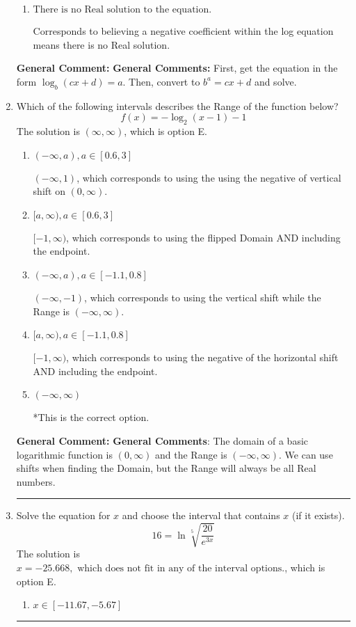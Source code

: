 \documentclass{extbook}[14pt]
\newcommand{\litem}[1]{\item #1

\rule{\textwidth}{0.4pt}}
\begin{document}
\begin{enumerate}
{\begin{enumerate}[label=\Alph*.]
$x = 4.250$, which corresponds to ignoring the vertical shift when converting to exponential form.
\item \( \text{There is no Real solution to the equation.} \)

Corresponds to believing a negative coefficient within the log equation means there is no Real solution.
\end{enumerate}

\textbf{General Comment:} \textbf{General Comments:} First, get the equation in the form $\log_b{(cx+d)} = a$. Then, convert to $b^a = cx+d$ and solve.
}
\litem{
Which of the following intervals describes the Range of the function below?
\[ f(x) = -\log_2{(x-1)}-1 \]The solution is \( (\infty, \infty) \), which is option E.\begin{enumerate}[label=\Alph*.]
\item \( (-\infty, a), a \in [0.6, 3] \)

$(-\infty, 1)$, which corresponds to using the using the negative of vertical shift on $(0, \infty)$.
\item \( [a, \infty), a \in [0.6, 3] \)

$[-1, \infty)$, which corresponds to using the flipped Domain AND including the endpoint.
\item \( (-\infty, a), a \in [-1.1, 0.8] \)

$(-\infty, -1)$, which corresponds to using the vertical shift while the Range is $(-\infty, \infty)$.
\item \( [a, \infty), a \in [-1.1, 0.8] \)

$[-1, \infty)$, which corresponds to using the negative of the horizontal shift AND including the endpoint.
\item \( (-\infty, \infty) \)

*This is the correct option.
\end{enumerate}

\textbf{General Comment:} \textbf{General Comments}: The domain of a basic logarithmic function is $(0, \infty)$ and the Range is $(-\infty, \infty)$. We can use shifts when finding the Domain, but the Range will always be all Real numbers.
}
\litem{
 Solve the equation for $x$ and choose the interval that contains $x$ (if it exists).
\[  16 = \ln{\sqrt[5]{\frac{20}{e^{3x}}}} \]The solution is \( x = -25.668, \text{ which does not fit in any of the interval options.} \), which is option E.\begin{enumerate}[label=\Alph*.]
\item \( x \in [-11.67, -5.67] \)


\end{enumerate}}
\end{enumerate}
\end{document}
